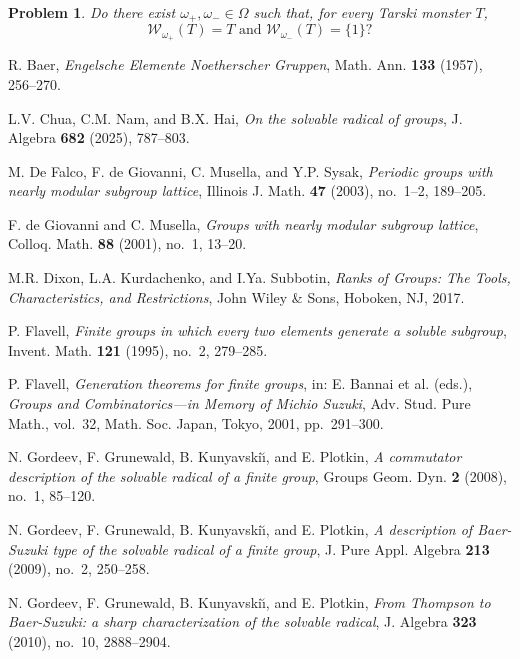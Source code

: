 \documentclass[11pt, reqno]{amsart}
\numberwithin{equation}{section}
\newtheorem*{problem}{Problem}
\theoremstyle{definition}
\numberwithin{equation}{section}
\begin{document}
\begin{problem}
\label{quest:tarski_wilson}
Do there exist $\omega_+,\omega_-\in\Omega$ such that, for every Tarski
monster $T$,
  $$\mathcal W_{\omega_+}(T)=T \text{ and } \mathcal W_{\omega_-}(T)=\{1\}?$$
\end{problem}

\begin{thebibliography}{}

 R. Baer, \emph{Engelsche Elemente Noetherscher Gruppen}, Math. Ann. \textbf{133} (1957), 256--270.

L.V. Chua, C.M. Nam, and B.X. Hai,
\emph{On the solvable radical of groups}, J. Algebra \textbf{682} (2025), 787--803.

 M. De Falco, F. de Giovanni, C. Musella, and Y.P. Sysak, \emph{Periodic groups with nearly modular subgroup lattice}, Illinois J. Math. \textbf{47} (2003), no.~1--2, 189--205.

 F. de Giovanni and C. Musella, \emph{Groups with nearly modular subgroup lattice}, Colloq. Math. \textbf{88} (2001), no.~1, 13--20.

 M.R. Dixon, L.A. Kurdachenko, and I.Ya. Subbotin, \emph{Ranks of Groups: The Tools, Characteristics, and Restrictions}, John Wiley \& Sons, Hoboken, NJ, 2017.

 P. Flavell, \emph{Finite groups in which every two elements generate a soluble subgroup}, Invent. Math. \textbf{121} (1995), no.~2, 279--285.

 P. Flavell,
\emph{Generation theorems for finite groups}, in: E. Bannai et al. (eds.), \emph{Groups and Combinatorics---in Memory of Michio Suzuki}, Adv. Stud. Pure Math., vol.~32, Math. Soc. Japan, Tokyo, 2001, pp.~291--300.

 N. Gordeev, F. Grunewald, B. Kunyavski\u{\i},  and E. Plotkin, \emph{A commutator description of the solvable radical of a finite group}, Groups Geom. Dyn. \textbf{2} (2008), no.~1, 85--120.

 N. Gordeev, F. Grunewald, B. Kunyavski\u{\i}, and E. Plotkin, \emph{A description of Baer-Suzuki type of the solvable radical of a finite group}, J. Pure Appl. Algebra \textbf{213} (2009), no.~2, 250--258.

 N. Gordeev, F. Grunewald, B. Kunyavski\u{\i}, and E. Plotkin, \emph{From Thompson to Baer-Suzuki: a sharp characterization of the solvable radical}, J. Algebra \textbf{323} (2010), no.~10, 2888--2904. 


\end{thebibliography}
\end{document}

